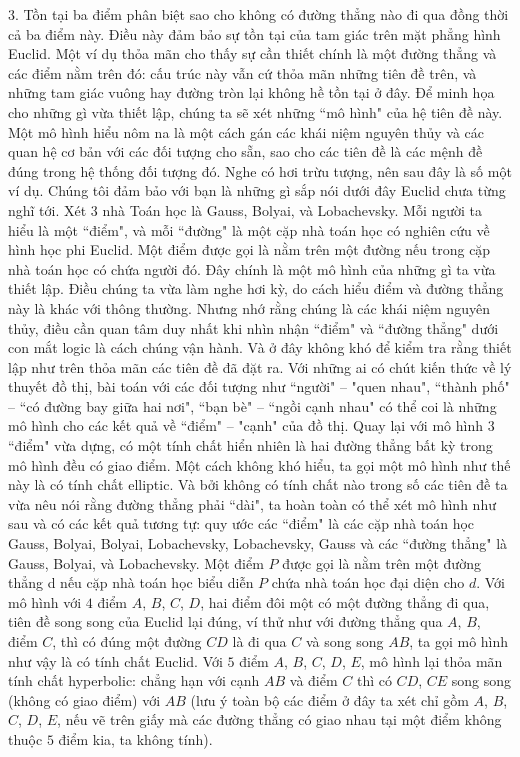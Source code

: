 \begin{multicols}{2}
	\vskip 0.1cm
	$3.$ Tồn tại ba điểm phân biệt sao cho không có đường thẳng nào đi qua đồng thời cả ba điểm này. Điều này đảm bảo sự tồn tại của tam giác trên mặt phẳng hình Euclid. Một ví dụ thỏa mãn cho thấy sự cần thiết chính là một đường thẳng và các điểm nằm trên đó: cấu trúc này vẫn cứ thỏa mãn những tiên đề trên, và những tam giác vuông hay đường tròn lại không hề tồn tại ở đây.
	\vskip 0.1cm
	Để minh họa cho những gì vừa thiết lập, chúng ta sẽ xét những ``mô hình" của hệ tiên đề này. Một mô hình hiểu nôm na là một cách gán các khái niệm nguyên thủy và các quan hệ cơ bản với các đối tượng cho sẵn, sao cho các tiên đề là các mệnh đề đúng trong hệ thống đối tượng đó. Nghe có hơi trừu tượng, nên sau đây là số một ví dụ.
	\vskip 0.1cm
	Chúng tôi đảm bảo với bạn là những gì sắp nói dưới đây Euclid chưa từng nghĩ tới. Xét $3$ nhà Toán học là Gauss, Bolyai, và Lobachevsky. Mỗi người ta hiểu là một ``điểm", và mỗi ``đường" là một cặp nhà toán học có nghiên cứu về hình học phi Euclid. Một điểm được gọi là nằm trên một đường nếu trong cặp nhà toán học có chứa người đó. Đây chính là một mô hình của những gì ta vừa thiết lập.
	Điều chúng ta vừa làm nghe hơi kỳ, do cách hiểu điểm và đường thẳng này là khác với thông thường. Nhưng nhớ rằng chúng là các khái niệm nguyên thủy, điều cần quan tâm duy nhất khi nhìn nhận ``điểm" và ``đường thẳng" dưới con mắt logic là cách chúng vận hành. Và ở đây không khó để kiểm tra rằng thiết lập như trên thỏa mãn các tiên đề đã đặt ra. Với những ai có chút kiến thức về lý thuyết đồ thị, bài toán với các đối tượng như ``người" -- "quen nhau", ``thành phố" -- ``có đường bay giữa hai nơi", ``bạn bè" -- ``ngồi cạnh nhau" có thể coi là những mô hình cho các kết quả về ``điểm" -- "cạnh" của đồ thị. 
	Quay lại với mô hình $3$ ``điểm" vừa dựng, có một tính chất hiển nhiên là hai đường thẳng bất kỳ trong mô hình đều có giao điểm. Một cách không khó hiểu, ta gọi một mô hình như thế này là có tính chất elliptic.
	Và bởi không có tính chất nào trong số các tiên đề ta vừa nêu nói rằng đường thẳng phải ``dài", ta hoàn toàn có thể xét mô hình như sau và có các kết quả tương tự: quy ước các ``điểm" là các cặp nhà toán học {Gauss, Bolyai}, {Bolyai, Lobachevsky}, {Lobachevsky, Gauss} và các ``đường thẳng" là Gauss, Bolyai, và Lobachevsky. Một điểm $P$ được gọi là nằm trên một đường thẳng d nếu cặp nhà toán học biểu diễn $P$ chứa nhà toán học đại diện cho $d$. 
	\vskip 0.1cm
	Với mô hình với $4$ điểm $A$, $B$, $C$, $D$, hai điểm đôi một có một đường thẳng đi qua, tiên đề song song của Euclid lại đúng, ví thử như với đường thẳng qua $A$, $B$, điểm $C$, thì có đúng một đường $CD$ là đi qua $C$ và song song $AB$, ta gọi mô hình như vậy là có tính chất Euclid. Với $5$ điểm $A$, $B$, $C$, $D$, $E$, mô hình lại thỏa mãn tính chất hyperbolic: chẳng hạn với cạnh $AB$ và điểm $C$ thì có $CD$, $CE$ song song (không có giao điểm) với $AB$ (lưu ý toàn bộ các điểm ở đây ta xét chỉ gồm $A$, $B$, $C$, $D$, $E$, nếu vẽ trên giấy mà các đường thẳng có giao nhau tại một điểm không thuộc $5$ điểm kia, ta không tính).

\end{multicols}
